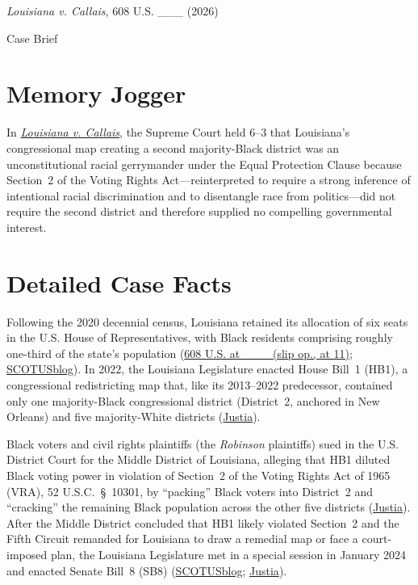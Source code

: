 \documentclass[12pt]{article}
\begin{document}
\begin{center}
{\LARGE \textit{Louisiana v. Callais}, 608 U.S. \_\_\_ (2026)\par}
\vspace{0.8em}
{\large Case Brief\par}
\end{center}
\vspace{1em}

\section{Memory Jogger}

In \href{https://www.courtlistener.com/opinion/10852760/louisiana-v-callais-revisions-50426/}{\textit{Louisiana v. Callais}}, the Supreme Court held 6--3 that Louisiana's congressional map creating a second majority-Black district was an unconstitutional racial gerrymander under the Equal Protection Clause because Section~2 of the Voting Rights Act---reinterpreted to require a strong inference of intentional racial discrimination and to disentangle race from politics---did not require the second district and therefore supplied no compelling governmental interest.

\section{Detailed Case Facts}

Following the 2020 decennial census, Louisiana retained its allocation of six seats in the U.S. House of Representatives, with Black residents comprising roughly one-third of the state's population (\href{https://supreme.justia.com/cases/federal/us/608/24-109/}{608 U.S. at \_\_\_ (slip op., at 11)}; \href{https://www.scotusblog.com/2026/04/in-major-voting-rights-act-case-supreme-court-strikes-down-redistricting-map-challenged-as-racia/}{SCOTUSblog}). In 2022, the Louisiana Legislature enacted House Bill~1 (HB1), a congressional redistricting map that, like its 2013--2022 predecessor, contained only one majority-Black congressional district (District~2, anchored in New Orleans) and five majority-White districts (\href{https://supreme.justia.com/cases/federal/us/608/24-109/}{Justia}).

Black voters and civil rights plaintiffs (the \textit{Robinson} plaintiffs) sued in the U.S. District Court for the Middle District of Louisiana, alleging that HB1 diluted Black voting power in violation of Section~2 of the Voting Rights Act of 1965 (VRA), 52 U.S.C.~\S~10301, by ``packing'' Black voters into District~2 and ``cracking'' the remaining Black population across the other five districts (\href{https://supreme.justia.com/cases/federal/us/608/24-109/}{Justia}). After the Middle District concluded that HB1 likely violated Section~2 and the Fifth Circuit remanded for Louisiana to draw a remedial map or face a court-imposed plan, the Louisiana Legislature met in a special session in January 2024 and enacted Senate Bill~8 (SB8) (\href{https://www.scotusblog.com/2026/04/in-major-voting-rights-act-case-supreme-court-strikes-down-redistricting-map-challenged-as-racia/}{SCOTUSblog}; \href{https://supreme.justia.com/cases/federal/us/608/24-109/}{Justia}).
\end{document}
